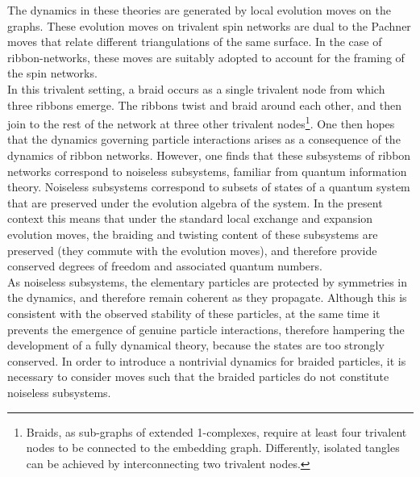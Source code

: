 \documentclass[aps,nofootinbib,amsfonts,superscriptaddress]{revtex4}
\begin{document}
The dynamics in these theories are generated by local evolution moves on the graphs. These evolution moves on trivalent spin networks are dual to the Pachner moves that relate different triangulations of the same surface. In the case of ribbon-networks, these moves are suitably adopted to account for the framing of the spin networks. \\

In this trivalent setting, a braid occurs as a single trivalent node from which three ribbons emerge. The ribbons twist and braid around each other, and then join to the rest of the network at three other trivalent nodes\footnote{Braids, as sub-graphs of extended 1-complexes, require at least four trivalent nodes to be connected to the embedding graph. Differently, isolated tangles can be achieved by interconnecting two trivalent nodes.}. One then hopes that the dynamics governing particle interactions arises as a consequence of the dynamics of ribbon networks. However, one finds that these subsystems of ribbon networks correspond to noiseless subsystems, familiar from quantum information theory. Noiseless subsystems correspond to subsets of states of a quantum system that are preserved under the evolution algebra of the system. In the present context this means that under the standard local exchange and expansion evolution moves, the braiding and twisting content of these subsystems are preserved (they commute with the evolution moves), and therefore provide conserved degrees of freedom and associated quantum numbers.\\
%

As noiseless subsystems, the elementary particles are protected by symmetries in the dynamics, and therefore remain coherent as they propagate. Although this is consistent with the observed stability of these particles, at the same time it prevents the emergence of genuine particle interactions, therefore hampering the development of a fully dynamical theory, because the states are too strongly conserved. In order to introduce a nontrivial dynamics for braided particles, it is necessary to consider moves such that the braided particles do not constitute noiseless subsystems.\\

%
\end{document}

